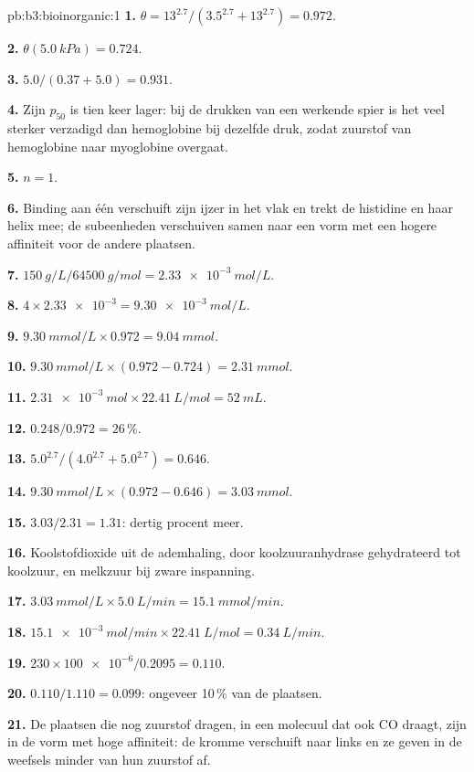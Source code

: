 \begin{solution}{pb:b3:bioinorganic:1}
\textbf{1.} $\theta = 13^{2.7}/(3.5^{2.7} + 13^{2.7}) = 0.972$.

\textbf{2.} $\theta(\qty{5.0}{kPa}) = 0.724$.

\textbf{3.} $5.0/(0.37 + 5.0) = 0.931$.

\textbf{4.} Zijn $p_{50}$ is tien keer lager: bij de drukken van een werkende spier is het veel sterker
verzadigd dan hemoglobine bij dezelfde druk, zodat zuurstof van
hemoglobine naar myoglobine overgaat.

\textbf{5.} $n = 1$.

\textbf{6.} Binding aan één  verschuift zijn ijzer in het vlak en
trekt de histidine en haar helix mee; de subeenheden verschuiven samen
naar een vorm met een hogere affiniteit voor de andere plaatsen.

\textbf{7.} $\qty{150}{g/L}/\qty{64500}{g/mol} = \qty{2.33e-3}{mol/L}$.

\textbf{8.} $4 \times \num{2.33e-3} = \qty{9.30e-3}{mol/L}$.

\textbf{9.} $\qty{9.30}{mmol/L} \times 0.972 = \qty{9.04}{mmol}$.

\textbf{10.} $\qty{9.30}{mmol/L} \times (0.972 - 0.724) = \qty{2.31}{mmol}$.

\textbf{11.} $\qty{2.31e-3}{mol} \times \qty{22.41}{L/mol} = \qty{52}{mL}$.

\textbf{12.} $0.248/0.972 = 26$\,\%.

\textbf{13.} $5.0^{2.7}/(4.0^{2.7} + 5.0^{2.7}) = 0.646$.

\textbf{14.} $\qty{9.30}{mmol/L} \times (0.972 - 0.646) = \qty{3.03}{mmol}$.

\textbf{15.} $3.03/2.31 = 1.31$: dertig procent meer.

\textbf{16.} Koolstofdioxide uit de ademhaling, door koolzuuranhydrase
gehydrateerd tot koolzuur, en melkzuur bij zware inspanning.

\textbf{17.} $\qty{3.03}{mmol/L} \times \qty{5.0}{L/min} = \qty{15.1}{mmol/min}$.

\textbf{18.} $\qty{15.1e-3}{mol/min} \times \qty{22.41}{L/mol} = \qty{0.34}{L/min}$.

\textbf{19.} $230 \times \num{100e-6}/0.2095 = 0.110$.

\textbf{20.} $0.110/1.110 = 0.099$: ongeveer 10\,\% van de plaatsen.

\textbf{21.} De plaatsen die nog zuurstof dragen, in een molecuul dat ook
CO draagt, zijn in de vorm met hoge affiniteit: de kromme verschuift naar
links en ze geven in de weefsels minder van hun zuurstof af.


\end{solution}

